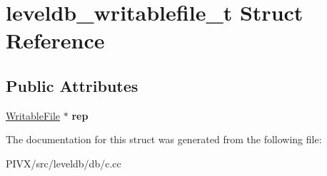 \hypertarget{structleveldb__writablefile__t}{}\section{leveldb\+\_\+writablefile\+\_\+t Struct Reference}
\label{structleveldb__writablefile__t}
\subsection*{Public Attributes}
\begin{DoxyCompactItemize}
\item 
\mbox{\label{structleveldb__writablefile__t_a3cf7e2a9ac0560d667deee9d574d7761}} 
\mbox{\hyperlink{classleveldb_1_1_writable_file}{Writable\+File}} $\ast$ {\bfseries rep}
\end{DoxyCompactItemize}


The documentation for this struct was generated from the following file\+:\begin{DoxyCompactItemize}
\item 
P\+I\+V\+X/src/leveldb/db/c.\+cc\end{DoxyCompactItemize}
